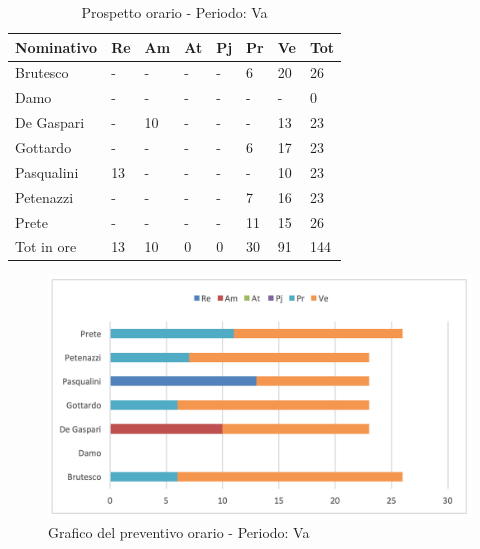 							\begin{table}[H] \begin{center} \begin{tabular}{llllllll}
							\toprule
							\textbf{Nominativo}		&	\textbf{Re}	&	\textbf{Am}	&	\textbf{At}	&	\textbf{Pj}	&	\textbf{Pr}	&	\textbf{Ve}	&	\textbf{Tot}\\
							\midrule
							Brutesco	&	-	&	-	&	-	&	-	&	6	&	20	&	26	 \\
							Damo	&	-	&	-	&	-	&	-	&	-	&	-	&	0	 \\
							De Gaspari	&	-	&	10	&	-	&	-	&	-	&	13	&	23	 \\
							Gottardo	&	-	&	-	&	-	&	-	&	6	&	17	&	23	 \\
							Pasqualini	&	13	&	-	&	-	&	-	&	-	&	10	&	23	 \\
							Petenazzi	&	-	&	-	&	-	&	-	&	7	&	16	&	23	 \\
							Prete	&	-	&	-	&	-	&	-	&	11	&	15	&	26	 \\
							\midrule
							Tot in ore	&	13	&	10	&	0	&	0	&	30	&	91	&	144	 \\


							\bottomrule
							\end{tabular} \end{center} \caption{Prospetto orario - Periodo:
							Va
							}\label{tab:h_Va} \end{table}		\begin{figure}[H]  \centering  \includegraphics[scale=0.42]{img/h_Va}
									\caption{Grafico del preventivo orario - Periodo: 								Va	}  \label{fig:h_Va	} \end{figure}
